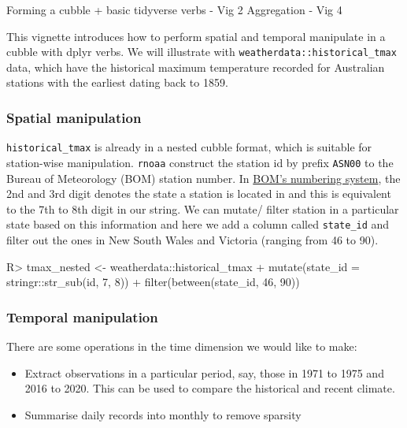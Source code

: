 \documentclass[
]{jss}
\providecommand{\tightlist}{%
  \setlength{\itemsep}{0pt}\setlength{\parskip}{0pt}}
\begin{document}
Forming a cubble + basic tidyverse verbs - Vig 2 Aggregation - Vig 4

This vignette introduces how to perform spatial and temporal manipulate
in a cubble with dplyr verbs. We will illustrate with
\texttt{weatherdata::historical\_tmax} data, which have the historical
maximum temperature recorded for Australian stations with the earliest
dating back to 1859.

\hypertarget{spatial-manipulation}{%
\subsubsection{Spatial manipulation}\label{spatial-manipulation}}

\texttt{historical\_tmax} is already in a nested cubble format, which is
suitable for station-wise manipulation. \texttt{rnoaa} construct the
station id by prefix \texttt{ASN00} to the Bureau of Meteorology (BOM)
station number. In
\href{http://www.bom.gov.au/climate/cdo/about/site-num.shtml}{BOM's
numbering system}, the 2nd and 3rd digit denotes the state a station is
located in and this is equivalent to the 7th to 8th digit in our string.
We can mutate/ filter station in a particular state based on this
information and here we add a column called \texttt{state\_id} and
filter out the ones in New South Wales and Victoria (ranging from 46 to
90).

\begin{CodeChunk}
\begin{CodeInput}
R> tmax_nested <- weatherdata::historical_tmax %
+   mutate(state_id = stringr::str_sub(id, 7, 8)) %
+   filter(between(state_id, 46, 90))
\end{CodeInput}
\end{CodeChunk}

\hypertarget{temporal-manipulation}{%
\subsubsection{Temporal manipulation}\label{temporal-manipulation}}

There are some operations in the time dimension we would like to make:

\begin{itemize}
\tightlist
\item
  Extract observations in a particular period, say, those in 1971 to
  1975 and 2016 to 2020. This can be used to compare the historical and
  recent climate.
\item
  Summarise daily records into monthly to remove sparsity
\end{itemize}
\end{document}
